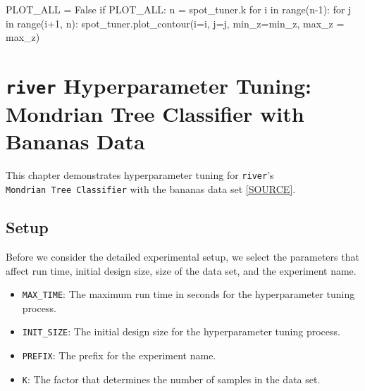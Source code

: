 \documentclass[
  letterpaper,
  DIV=11,
  numbers=noendperiod]{scrreprt}
\newenvironment{Shaded}{\begin{snugshade}}{\end{snugshade}}
\newcommand{\BuiltInTok}[1]{\textcolor[rgb]{0.00,0.23,0.31}{#1}}
\newcommand{\ControlFlowTok}[1]{\textcolor[rgb]{0.00,0.23,0.31}{#1}}
\newcommand{\DecValTok}[1]{\textcolor[rgb]{0.68,0.00,0.00}{#1}}
\newcommand{\KeywordTok}[1]{\textcolor[rgb]{0.00,0.23,0.31}{#1}}
\newcommand{\NormalTok}[1]{\textcolor[rgb]{0.00,0.23,0.31}{#1}}
\newcommand{\OperatorTok}[1]{\textcolor[rgb]{0.37,0.37,0.37}{#1}}
\newcommand{\VariableTok}[1]{\textcolor[rgb]{0.07,0.07,0.07}{#1}}
\providecommand{\tightlist}{%
  \setlength{\itemsep}{0pt}\setlength{\parskip}{0pt}}\usepackage{longtable,booktabs,array}
\begin{document}
\begin{Shaded}
\begin{Highlighting}[]
\NormalTok{PLOT\_ALL }\OperatorTok{=} \VariableTok{False}
\ControlFlowTok{if}\NormalTok{ PLOT\_ALL:}
\NormalTok{    n }\OperatorTok{=}\NormalTok{ spot\_tuner.k}
    \ControlFlowTok{for}\NormalTok{ i }\KeywordTok{in} \BuiltInTok{range}\NormalTok{(n}\OperatorTok{{-}}\DecValTok{1}\NormalTok{):}
        \ControlFlowTok{for}\NormalTok{ j }\KeywordTok{in} \BuiltInTok{range}\NormalTok{(i}\OperatorTok{+}\DecValTok{1}\NormalTok{, n):}
\NormalTok{            spot\_tuner.plot\_contour(i}\OperatorTok{=}\NormalTok{i, j}\OperatorTok{=}\NormalTok{j, min\_z}\OperatorTok{=}\NormalTok{min\_z, max\_z }\OperatorTok{=}\NormalTok{ max\_z)}
\end{Highlighting}
\end{Shaded}

\hypertarget{river-hyperparameter-tuning-mondrian-tree-classifier-with-bananas-data}{%
\chapter{\texorpdfstring{\texttt{river} Hyperparameter Tuning: Mondrian
Tree Classifier with Bananas
Data}{river Hyperparameter Tuning: Mondrian Tree Classifier with Bananas Data}}\label{river-hyperparameter-tuning-mondrian-tree-classifier-with-bananas-data}}

This chapter demonstrates hyperparameter tuning for \texttt{river}'s
\texttt{Mondrian\ Tree\ Classifier} with the bananas data set
\href{https://riverml.xyz/0.19.0/api/datasets/Bananas/}{{[}SOURCE{]}}.

\hypertarget{sec-setup-13}{%
\section{Setup}\label{sec-setup-13}}

Before we consider the detailed experimental setup, we select the
parameters that affect run time, initial design size, size of the data
set, and the experiment name.

\begin{itemize}
\tightlist
\item
  \texttt{MAX\_TIME}: The maximum run time in seconds for the
  hyperparameter tuning process.
\item
  \texttt{INIT\_SIZE}: The initial design size for the hyperparameter
  tuning process.
\item
  \texttt{PREFIX}: The prefix for the experiment name.
\item
  \texttt{K}: The factor that determines the number of samples in the
  data set.
\end{itemize}
\end{document}

